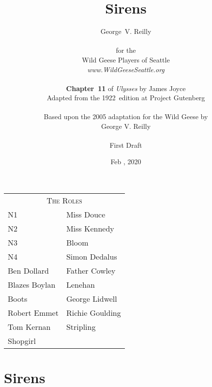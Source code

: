 


\title{\Huge Sirens}
\author{George~V. Reilly\\
\\
{\small for the}\\
Wild Geese Players of Seattle\\
{\textit{www.WildGeeseSeattle.org}}\\
\\
{\small \textbf{Chapter~11} of \textit{Ulysses} by James Joyce}\\
{\small Adapted from the 1922~edition at Project Gutenberg}
\\
\\
{\small Based upon the 2005 adaptation for the Wild Geese by}\\
{\small George V. Reilly}\\
\\
{\small First Draft}}
\date{Feb , 2020}
\raggedbottom



\maketitle
\thispagestyle{empty}
\pagebreak

\begin{tabular}{lp{10cm}}
    \multicolumn{2}{c}{\Large \textsc{The Roles}} \\
N1              & Miss Douce \\
N2              & Miss Kennedy \\
N3              & Bloom \\
N4              & Simon Dedalus \\
Ben Dollard     & Father Cowley \\
Blazes Boylan   & Lenehan \\
Boots           & George Lidwell \\
Robert Emmet    & Richie Goulding \\
Tom Kernan      & Stripling \\
Shopgirl \\
\end{tabular}

\thispagestyle{empty}
\newpage


\setcounter{page}{1}

\section*{Sirens}




